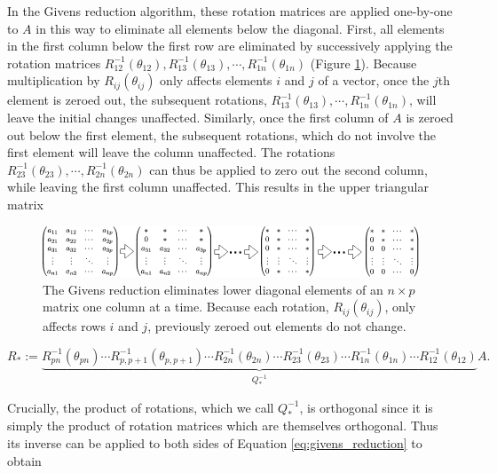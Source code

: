 \documentclass[ba]{imsart}
\numberwithin{equation}{section}
\theoremstyle{plain}
\begin{document}
\noindent In the Givens reduction algorithm, these rotation matrices are applied one-by-one to $A$ in this way to eliminate all elements below the diagonal. First, all elements in the first column below the first row are eliminated by successively applying the rotation matrices $R_{12}^{-1}(\theta_{12}), R_{13}^{-1}(\theta_{13}), \cdots, R_{1n}^{-1}(\theta_{1n})$  (Figure \ref{fig:givens_reduction}). Because multiplication by $R_{ij}(\theta_{ij})$ only affects elements $i$ and $j$ of a vector, once the $j$th element is zeroed out, the subsequent rotations, $R_{13}^{-1}(\theta_{13}), \cdots, R_{1n}^{-1}(\theta_{1n})$, will leave the initial changes unaffected. Similarly, once the first column of $A$ is zeroed out below the first element, the subsequent rotations, which do not involve the first element will leave the column unaffected. The rotations  $R_{23}^{-1}(\theta_{23}), \cdots, R_{2n}^{-1}(\theta_{2n})$ can thus be applied to zero out the second column, while leaving the first column unaffected. This results in the upper triangular matrix

\begin{figure}[h]
\centering
\vspace{.1in}
\includegraphics[width=1.0\textwidth]{figures/givens_reduction.png}
\vspace{.05in}
\caption{The Givens reduction eliminates lower diagonal elements of an $n \times p$ matrix one column at a time. Because each rotation, $R_{ij}(\theta_{ij})$, only affects rows $i$ and $j$, previously zeroed out elements do not change.}
\label{fig:givens_reduction}
\end{figure}

\begin{equation}
\label{eq:givens_reduction}
R_* := \underbrace{R_{pn}^{-1}(\theta_{pn}) \cdots R_{p,p+1}^{-1}(\theta_{p,p+1})  \cdots R_{2n}^{-1}(\theta_{2n}) \cdots R_{23}^{-1}(\theta_{23}) \cdots R_{1n}^{-1}(\theta_{1n}) \cdots R_{12}^{-1}(\theta_{12})}_{Q_*^{-1}} A.
\end{equation}

\noindent Crucially, the product of rotations, which we call $Q_*^{-1}$, is orthogonal since it is simply the product of rotation matrices which are themselves orthogonal. Thus its inverse can be applied to both sides of Equation \ref{eq:givens_reduction} to obtain
\end{document}
